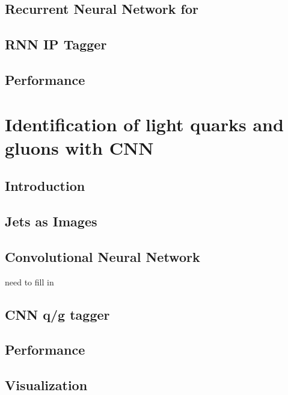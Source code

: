 \documentclass{report}
\begin{document}
\section{Recurrent Neural Network for \btagging}


\section{RNN IP Tagger}


\section{Performance}



\chapter{Identification of light quarks and gluons with CNN}
\label{chap:qgtagging}
\section{Introduction}


\section{Jets as Images}


\section{Convolutional Neural Network}
need to fill in

\section{CNN q/g tagger}


\section{Performance}


\section{Visualization}

\end{document}
